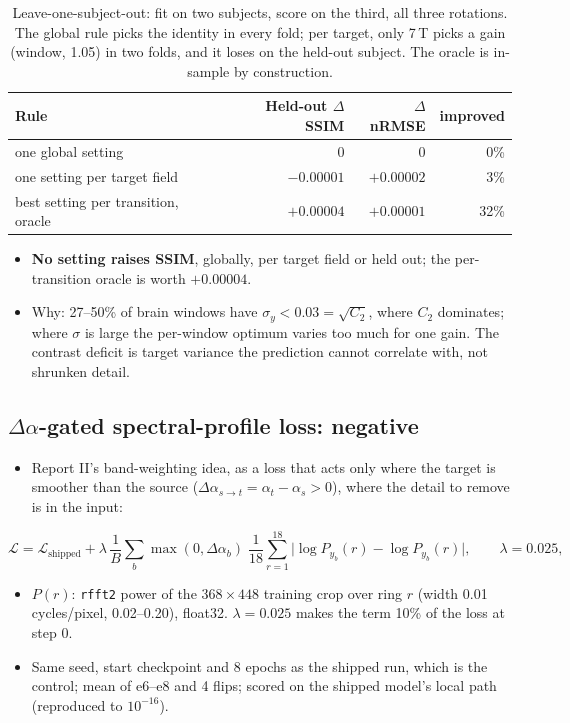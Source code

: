 \documentclass[10pt,a4paper]{article}
\newcommand{\da}{\Delta\alpha}
\begin{document}
\begin{table}[H]
\centering\small
\begin{tabular}{lrrr}
\toprule
Rule & Held-out $\Delta$SSIM & $\Delta$nRMSE & improved \\
\midrule
one global setting                 & $0$         & $0$          & 0\% \\
one setting per target field       & $-0.00001$  & $+0.00002$   & 3\% \\
best setting per transition, oracle & $+0.00004$ & $+0.00001$   & 32\% \\
\bottomrule
\end{tabular}
\caption{Leave-one-subject-out: fit on two subjects, score on the third, all three rotations.
The global rule picks the identity in every fold; per target, only 7\,T picks a gain (window,
1.05) in two folds, and it loses on the held-out subject. The oracle is in-sample by
construction.}
\label{tab:e1loso}
\end{table}

\begin{itemize}
  \item \textbf{No setting raises SSIM}, globally, per target field or held out; the
        per-transition oracle is worth $+0.00004$.
  \item Why: 27--50\% of brain windows have $\sigma_y < 0.03 = \sqrt{C_2}$, where $C_2$ dominates;
        where $\sigma$ is large the per-window optimum varies too much for one gain. The contrast
        deficit is target variance the prediction cannot correlate with, not shrunken detail.
\end{itemize}

\subsection{$\Delta\alpha$-gated spectral-profile loss: negative}\label{sec:loss}

\begin{itemize}
  \item Report II's band-weighting idea, as a loss that acts only where the target is smoother
        than the source ($\da_{s\to t} = \alpha_t - \alpha_s > 0$), where the detail to remove
        is in the input:
\end{itemize}
\[
  \mathcal{L} = \mathcal{L}_{\text{shipped}}
  + \lambda\, \frac{1}{B}\sum_{b} \max(0, \da_b)\; \frac{1}{18}\sum_{r=1}^{18}
    \bigl|\log P_{\hat y_b}(r) - \log P_{y_b}(r)\bigr|,
  \qquad \lambda = 0.025,
\]
\begin{itemize}
  \item $P(r)$: \texttt{rfft2} power of the $368\times448$ training crop over ring $r$ (width 0.01
        cycles/pixel, 0.02--0.20), float32. $\lambda = 0.025$ makes the term 10\% of the loss at
        step 0.
  \item Same seed, start checkpoint and 8 epochs as the shipped run, which is the control; mean of
        e6--e8 and 4 flips; scored on the shipped model's local path (reproduced to $10^{-16}$).
\end{itemize}
\end{document}
